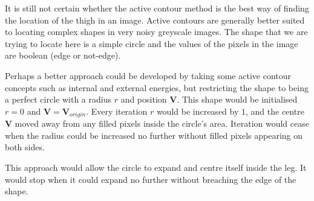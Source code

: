 \bigskip
\noindent It is still not certain whether the active contour method is the best way of finding the location of the thigh in an image.
Active contours are generally better suited to locating complex shapes in very noisy greyscale images.
The shape that we are trying to locate here is a simple circle and the values of the pixels in the image are boolean (edge or not-edge).

Perhaps a better approach could be developed by taking some active contour concepts such as internal and external energies,
but restricting the shape to being a perfect circle with a radius $r$ and position $\mathbf{V}$.
This shape would be initialised $r = 0$ and $\mathbf{V} = \mathbf{V}_{origin}$.
Every iteration $r$ would be increased by $1$, and the centre $\mathbf{V}$ moved away from any filled pixels inside the circle's area.
Iteration would cease when the radius could be increased no further without filled pixels appearing on both sides.

This approach would allow the circle to expand and centre itself inside the leg.
It would stop when it could expand no further without breaching the edge of the shape.
